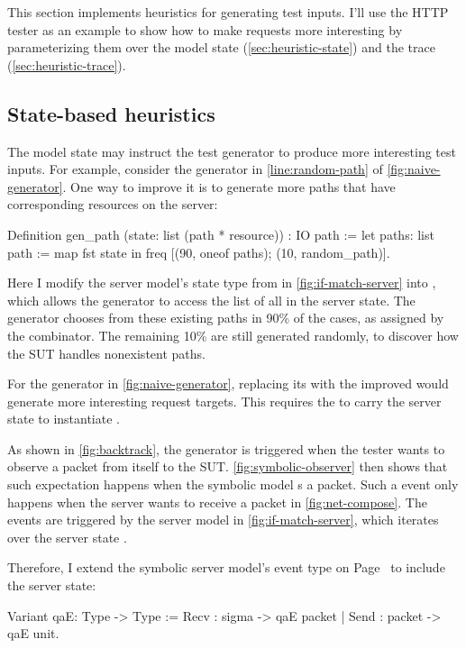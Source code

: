 This section implements heuristics for generating test inputs.  I'll use the
HTTP tester as an example to show how to make requests more interesting by
parameterizing them over the model state (\autoref{sec:heuristic-state}) and the
trace (\autoref{sec:heuristic-trace}).

\subsection{State-based heuristics}
\label{sec:heuristic-state}
The model state may instruct the test generator to produce more interesting test
inputs.  For example, consider the  generator in
\autoref{line:random-path} of \autoref{fig:naive-generator}.  One way to improve
it is to generate more paths that have corresponding resources on the server:
\begin{coq}
  Definition gen_path (state: list (path * resource)) : IO path :=
    let paths: list path := map fst state in
    freq [(90, oneof paths);
          (10, random_path)].
\end{coq}

Here I modify the server model's state type  from  in \autoref{fig:if-match-server} into , which allows the generator to access the list of all 
  in the server state.  The generator chooses from these existing paths in 90\%
  of the cases, as assigned by the  combinator.  The remaining 10\%
  are still generated randomly, to discover how the SUT handles nonexistent
  paths.

For the  generator in \autoref{fig:naive-generator}, replacing
its  with the improved  would generate more
interesting request targets.  This requires the  to carry the
server state to instantiate .

As shown in \autoref{fig:backtrack}, the  generator is triggered
when the tester wants to observe a packet from itself to the SUT.
\autoref{fig:symbolic-observer} then shows that such  expectation
happens when the symbolic model s a packet.  Such a  event
only happens when the server wants to receive a packet in
\autoref{fig:net-compose}.  The  events are triggered by the server
model in \autoref{fig:if-match-server}, which iterates over the server state
.

Therefore, I extend the symbolic server model's  event type on
Page~\pageref{def:symbolic-qae} to include the server state:
\begin{coq}
  Variant qaE: Type -> Type :=
    Recv : sigma      -> qaE packet
  | Send : packet -> qaE unit.
\end{coq}

